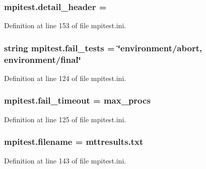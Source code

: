 \hypertarget{namespacempitest_a55ff433403a926c608140ebd229f138a}{
\subsubsection[{detail\-\_\-header}]{\setlength{\rightskip}{0pt plus 5cm}mpitest.\-detail\-\_\-header =}}\label{namespacempitest_a55ff433403a926c608140ebd229f138a}


Definition at line 153 of file mpitest.\-ini.

\hypertarget{namespacempitest_a6fd83076e5878f8964800690579327d8}{
\subsubsection[{fail\-\_\-tests}]{\setlength{\rightskip}{0pt plus 5cm}string mpitest.\-fail\-\_\-tests = \char`\"{}environment/abort, environment/final\char`\"{}}}\label{namespacempitest_a6fd83076e5878f8964800690579327d8}


Definition at line 124 of file mpitest.\-ini.

\hypertarget{namespacempitest_a54920d94a964e18fe3ad81cbe8363c36}{
\subsubsection[{fail\-\_\-timeout}]{\setlength{\rightskip}{0pt plus 5cm}mpitest.\-fail\-\_\-timeout = max\-\_\-procs}}\label{namespacempitest_a54920d94a964e18fe3ad81cbe8363c36}


Definition at line 125 of file mpitest.\-ini.

\hypertarget{namespacempitest_a7b80601152b8c206cc61614fcd09929a}{
\subsubsection[{filename}]{\setlength{\rightskip}{0pt plus 5cm}mpitest.\-filename = mttresults.\-txt}}\label{namespacempitest_a7b80601152b8c206cc61614fcd09929a}


Definition at line 143 of file mpitest.\-ini.

